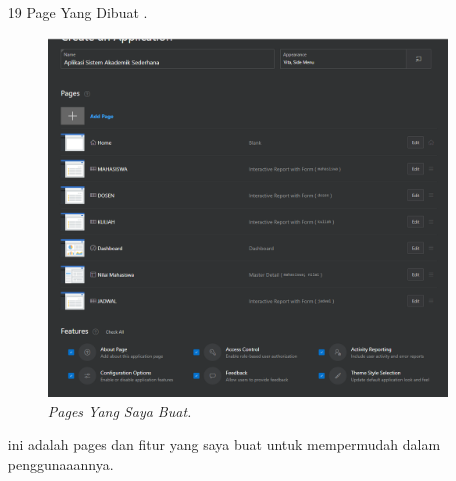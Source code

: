 \begin{enumerate}
\item[19]Page Yang Dibuat .
\begin{figure}[!htbp]
    \begin{center}
    \includegraphics[scale=0.3]{figures/MyApp.png}
    \caption{\textit{Pages Yang Saya Buat.}}
    \end{center}
\end{figure}
\par ini adalah pages dan fitur yang saya buat untuk mempermudah dalam penggunaaannya.


\end{enumerate}
